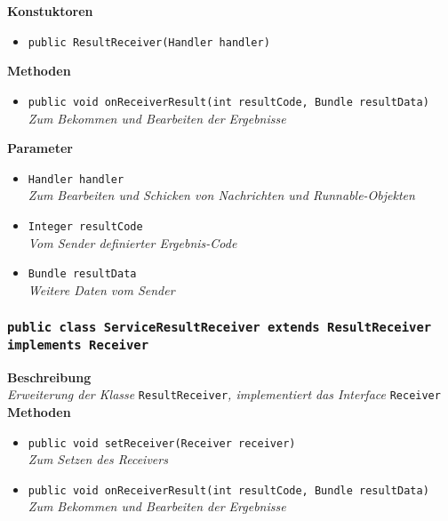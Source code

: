              	\textbf{Konstuktoren}
                \begin{itemize}
        		\item\texttt{{public ResultReceiver(Handler handler)}}\\
                \end{itemize}
               
                \textbf{Methoden}
                \begin{itemize}
        		\item\texttt{{public void onReceiverResult(int resultCode, Bundle resultData)}}\\
                \textit{Zum Bekommen und Bearbeiten der Ergebnisse}\\
                \end{itemize}
                
                \textbf{Parameter}
                \begin{itemize}
        		\item\texttt{Handler handler}\\ 
                \textit{Zum Bearbeiten und Schicken von Nachrichten und Runnable-Objekten}\\
				\item\texttt{Integer resultCode}\\ 
                \textit{Vom Sender definierter Ergebnis-Code}\\
                \item\texttt{Bundle resultData}\\ 
                \textit{Weitere Daten vom Sender }\\
                \end{itemize}
                
        \subsubsection{\texttt{public class ServiceResultReceiver extends ResultReceiver implements Receiver}}
               
               	\textbf{Beschreibung} \\
      	        \textit{Erweiterung der Klasse} \texttt{ResultReceiver}\textit{, implementiert das Interface} \texttt{Receiver}\\
                
                \textbf{Methoden}
                \begin{itemize}
        		\item\texttt{{public void setReceiver(Receiver receiver)}}\\
                \textit{Zum Setzen des Receivers}\\
                \item\texttt{{public void onReceiverResult(int resultCode, Bundle resultData)}}\\
                \textit{Zum Bekommen und Bearbeiten der Ergebnisse}\\
                \end{itemize}
                
